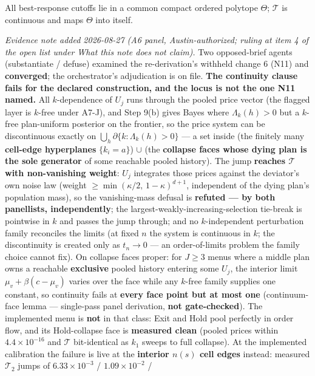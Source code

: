 \documentclass[11pt,a4paper]{article}
\newcommand{\Tmap}{\mathcal{T}}
\begin{document}
\begin{description}[leftmargin=1.9em,style=unboxed]
\item[A6 Compact outer self-map.] All best-response cutoffs lie in a common compact
  ordered polytope $\Theta$; $\Tmap$ is continuous and maps $\Theta$ into itself.

  \emph{Evidence note added 2026-08-27 (A6 panel, Austin-authorized; ruling at item 4 of
  the open list under \emph{What this note does not claim}).} Two opposed-brief agents
  (substantiate / defuse) examined the re-derivation's withheld change 6 (N11) and
  \textbf{converged}; the orchestrator's adjudication is on file. \textbf{The continuity
  clause fails for the declared construction, and the locus is not the one N11 named.} All
  $k$-dependence of $U_j$ runs through the pooled price vector (the flagged layer is
  $k$-free under A7-J), and Step 9(b) gives Bayes where $\Lambda_k(h)>0$ but a $k$-free
  plan-uniform posterior on the frontier, so the price system can be discontinuous exactly
  on $\bigcup_h\partial\{k:\Lambda_k(h)>0\}$ --- a set inside (the finitely many
  \textbf{cell-edge hyperplanes} $\{k_i=a\}$) $\cup$ (the \textbf{collapse faces whose
  dying plan is the sole generator} of some reachable pooled history). The jump
  \textbf{reaches $\Tmap$ with non-vanishing weight}: $U_j$ integrates those prices against
  the deviator's own noise law (weight $\ge\min(\kappa/2,\,1-\kappa)^{d+1}$, independent of
  the dying plan's population mass), so the vanishing-mass defusal is \textbf{refuted ---
  by both panellists, independently}; the largest-weakly-increasing-selection tie-break is
  pointwise in $k$ and passes the jump through; and no $k$-independent perturbation family
  reconciles the limits (at fixed $n$ the system is continuous in $k$; the discontinuity is
  created only as $t_n\to0$ --- an order-of-limits problem the family choice cannot fix).
  On collapse faces proper: for $J\ge3$ menus where a middle plan owns a reachable
  \textbf{exclusive} pooled history entering some $U_j$, the interior limit
  $\mu_v+\beta(c-\mu_v)$ varies over the face while any $k$-free family supplies one
  constant, so continuity fails at \textbf{every face point but at most one}
  (continuum-face lemma --- single-pass panel derivation, \textbf{not gate-checked}). The
  implemented menu is \textbf{not} in that class: Exit and Hold pool perfectly in order
  flow, and its Hold-collapse face is \textbf{measured clean} (pooled prices within
  $4.4\times10^{-16}$ and $\Tmap$ bit-identical as $k_1$ sweeps to full collapse). At the
  implemented calibration the failure is live at the \textbf{interior $n(s)$ cell edges}
  instead: measured $\Tmap_2$ jumps of $6.33\times10^{-3}$ / $1.09\times10^{-2}$ /

\end{description}
\end{document}
